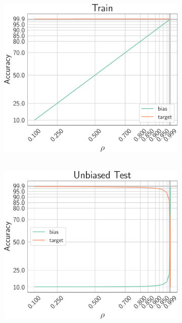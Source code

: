 \begin{figure}
    \begin{subfigure}{0.33\textwidth}
        \centering
        \includegraphics[width=\columnwidth]{img/mnist/train.pdf}
        \caption{~}
        \label{fig:mnist-train}
    \end{subfigure}
    \hfill
        \begin{subfigure}{0.33\textwidth}
        \centering
        \includegraphics[width=\columnwidth]{img/mnist/unbiased_test.pdf}

\end{subfigure}
\end{figure}
